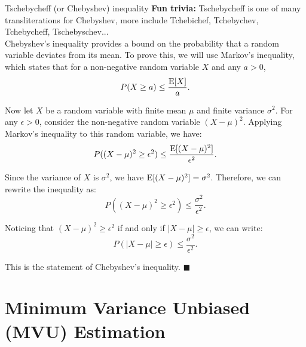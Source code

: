 \begin{sidenotebox}{Tschebycheff (or Chebyshev) inequality}
    \textbf{Fun trivia:} Tschebycheff is one of many transliterations for Chebyshev, more include Tchebichef, Tchebychev, Tchebycheff, Tschebyschev...\\

Chebyshev's inequality provides a bound on the probability that a random variable deviates from its mean. To prove this, we will use Markov's inequality, which states that for a non-negative random variable \(X\) and any \(a > 0\),
\begin{equation}
    P(X \geq a) \leq \frac{\text{E}[X]}{a}.
\end{equation}

Now let \(X\) be a random variable with finite mean \(\mu\) and finite variance \(\sigma^2\). For any \(\epsilon > 0\), consider the non-negative random variable \((X - \mu)^2\). Applying Markov's inequality to this random variable, we have:
\begin{equation}
    P((X - \mu)^2 \geq \epsilon^2) \leq \frac{\text{E}[(X - \mu)^2]}{\epsilon^2}.
\end{equation}

Since the variance of \(X\) is \(\sigma^2\), we have \(\text{E}[(X - \mu)^2] = \sigma^2\). Therefore, we can rewrite the inequality as:
\begin{equation}
    P((X - \mu)^2 \geq \epsilon^2) \leq \frac{\sigma^2}{\epsilon^2}.
\end{equation}

Noticing that \((X - \mu)^2 \geq \epsilon^2\) if and only if \(|X - \mu| \geq \epsilon\), we can write:
\begin{equation}
    P(|X - \mu| \geq \epsilon) \leq \frac{\sigma^2}{\epsilon^2}.
\end{equation}

This is the statement of Chebyshev's inequality. \(\blacksquare\)

\end{sidenotebox}

\section{Minimum Variance Unbiased (MVU) Estimation}